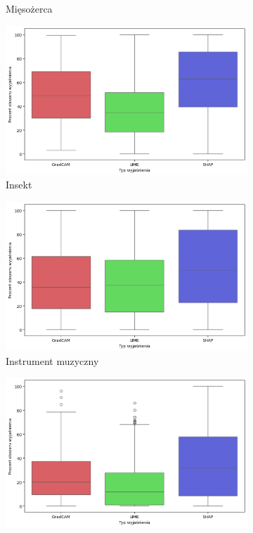 \begin{figure}[h]
\begin{subfigure}[b]{0.3\textwidth}
		\caption{Mięsożerca}
	\end{subfigure}
	\begin{subfigure}[b]{0.3\textwidth}
		\centering\includegraphics[width=.9\textwidth]{img/areaincorrect_insect}
		\caption{Insekt}
	\end{subfigure}
	\begin{subfigure}[b]{0.3\textwidth}
		\centering\includegraphics[width=.9\textwidth]{img/areaincorrect_music}
		\caption{Instrument muzyczny}
	\end{subfigure}
	\begin{subfigure}[b]{0.3\textwidth}
		\centering\includegraphics[width=.9\textwidth]{img/areaincorrect_primate}

\end{subfigure}
\end{figure}
